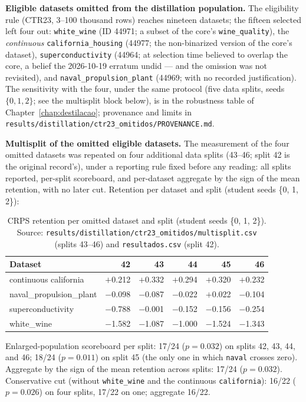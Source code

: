 \textbf{Eligible datasets omitted from the distillation
population.} The eligibility rule (CTR23, 3--100 thousand rows)
reaches nineteen datasets; the fifteen selected left four out:
\texttt{white\_wine} (ID 44971; a subset of the core's
\texttt{wine\_quality}), the \emph{continuous}
\texttt{california\_housing} (44977; the non-binarized version of
the core's dataset), \texttt{superconductivity} (44964; at
selection time believed to overlap the core, a belief the 2026-10-19
erratum undid --- and the omission was not revisited), and
\texttt{naval\_\allowbreak propulsion\_\allowbreak plant} (44969;
with no recorded
justification). The sensitivity with the four, under the same
protocol (five data splits, seeds $\{0,1,2\}$; see the multisplit
block below), is in the robustness table of
Chapter~\ref{chap:destilacao}; provenance and limits in
\texttt{results/\allowbreak distillation/\allowbreak ctr23\_\allowbreak omitidos/\allowbreak PROVENANCE.md}.

\textbf{Multisplit of the omitted eligible datasets.} The
measurement of the four omitted datasets was repeated on four
additional data splits (43--46; split 42 is the original record's),
under a reporting rule fixed before any reading: all splits
reported, per-split scoreboard, and per-dataset aggregate by the
sign of the mean retention, with no later cut. Retention per dataset
and split (student seeds \{0, 1, 2\}):

\begin{table}[htbp]
\centering
\caption[Multisplit of the omitted CTR23 datasets]{CRPS retention
per omitted dataset and split (student seeds \{0, 1, 2\}). Source:
\texttt{results/\allowbreak distillation/\allowbreak ctr23\_\allowbreak omitidos/\allowbreak multisplit.csv}
(splits 43--46) and \texttt{resultados.csv} (split 42).}
\label{tab:app-multisplit}
\small
\begin{tabular}{lrrrrr}
\toprule
Dataset & 42 & 43 & 44 & 45 & 46 \\
\midrule
continuous california & $+$0.212 & $+$0.332 & $+$0.294 & $+$0.320 & $+$0.232 \\
naval\_propulsion\_plant & $-$0.098 & $-$0.087 & $-$0.022 & $+$0.022 & $-$0.104 \\
superconductivity & $-$0.788 & $-$0.001 & $-$0.152 & $-$0.156 & $-$0.254 \\
white\_wine & $-$1.582 & $-$1.087 & $-$1.000 & $-$1.524 & $-$1.343 \\
\bottomrule
\end{tabular}
\end{table}

Enlarged-population scoreboard per split: 17/24 ($p=0.032$) on
splits 42, 43, 44, and 46; 18/24 ($p=0.011$) on split 45 (the only
one in which \texttt{naval} crosses zero). Aggregate by the sign of
the mean retention across splits: 17/24 ($p=0.032$). Conservative
cut (without \texttt{white\_wine} and the continuous
\texttt{california}): 16/22 ($p=0.026$) on four splits, 17/22 on
one; aggregate 16/22.
